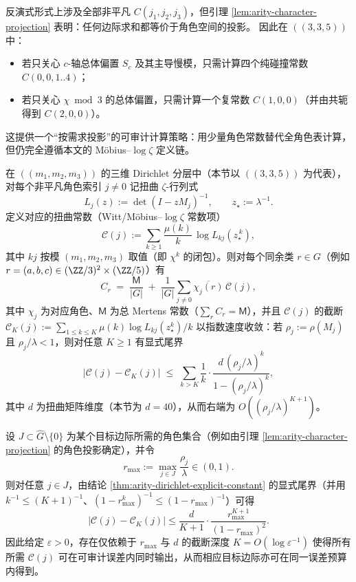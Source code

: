 \begin{remark}\label{rem:arity-335-projection-compression}
反演式形式上涉及全部非平凡 \(C(j_1,j_2,j_3)\)，但引理 \ref{lem:arity-character-projection} 表明：任何边际求和都等价于角色空间的投影。
因此在 \(((3,3,5))\) 中：
\begin{itemize}
  \item 若只关心 \(c\)-轴总体偏置 \(S_c\) 及其主导慢模，只需计算四个纯碰撞常数 \(C(0,0,1..4)\)；
  \item 若只关心 \(\chi\bmod 3\) 的总体偏置，只需计算一个复常数 \(C(1,0,0)\)（并由共轭得到 \(C(2,0,0)\)）。
\end{itemize}
这提供一个“按需求投影”的可审计计算策略：用少量角色常数替代全角色表计算，但仍完全遵循本文的 Möbius--\(\log\zeta\) 定义链。
\end{remark}

\begin{remark}\label{thm:arity-dirichlet-explicit-constant}
在 \(((m_1,m_2,m_3))\) 的三维 Dirichlet 分层中（本节以 \(((3,3,5))\) 为代表），对每个非平凡角色索引 \(j\neq 0\) 记扭曲 \(\zeta\)-行列式
\[
L_j(z):=\det(I-zM_j)^{-1},
\qquad
z_\star:=\lambda^{-1}.
\]
定义对应的扭曲常数（Witt/Möbius--\(\log\zeta\) 常数项）
\[
\mathcal{C}(j):=\sum_{k\ge 1}\frac{\mu(k)}{k}\,\log L_{kj}\!\left(z_\star^{\,k}\right),
\]
其中 \(kj\) 按模 \((m_1,m_2,m_3)\) 取值（即 \(\chi^{k}\) 的闭包）。则对每个同余类 \(r\in G\)（例如 \(r=(a,b,c)\in(\ZZ/3)^2\times(\ZZ/5)\)）有
\[
C_r
\;=\;
\frac{\mathsf{M}}{|G|}
\;+\;
\frac{1}{|G|}\sum_{j\neq 0}\overline{\chi_j(r)}\,\mathcal{C}(j),
\]
其中 \(\chi_j\) 为对应角色、\(\mathsf{M}\) 为总 Mertens 常数（\(\sum_r C_r=\mathsf{M}\)），并且 \(\mathcal{C}(j)\) 的截断
\(
\mathcal{C}_K(j):=\sum_{1\le k\le K}\mu(k)\log L_{kj}(z_\star^k)/k
\)
以指数速度收敛：若 \(\rho_j:=\rho(M_j)\) 且 \(\rho_j/\lambda<1\)，则对任意 \(K\ge 1\) 有显式尾界
\[
\left|\mathcal{C}(j)-\mathcal{C}_K(j)\right|
\;\le\;
\sum_{k>K}\frac{1}{k}\cdot
\frac{d\,(\rho_j/\lambda)^k}{1-(\rho_j/\lambda)^k},
\]
其中 \(d\) 为扭曲矩阵维度（本节为 \(d=40\)），从而右端为 \(O((\rho_j/\lambda)^{K+1})\)。
\end{remark}

\begin{remark}[误差预算下的对数截断深度]\label{rem:arity-dirichlet-explicit-constant-truncation-depth}
设 \(J\subset \widehat G\setminus\{0\}\) 为某个目标边际所需的角色集合（例如由引理 \ref{lem:arity-character-projection} 的角色投影确定），并令
\[
r_{\max}:=\max_{j\in J}\frac{\rho_j}{\lambda}\in(0,1).
\]
则对任意 \(j\in J\)，由结论 \ref{thm:arity-dirichlet-explicit-constant} 的显式尾界（并用 \(k^{-1}\le (K+1)^{-1}\)、\((1-r_{\max}^k)^{-1}\le (1-r_{\max})^{-1}\)）可得
\[
\bigl|\mathcal{C}(j)-\mathcal{C}_K(j)\bigr|
\le
\frac{d}{K+1}\cdot\frac{r_{\max}^{K+1}}{(1-r_{\max})^2}.
\]
因此给定 \(\varepsilon>0\)，存在仅依赖于 \(r_{\max}\) 与 \(d\) 的截断深度 \(K=O(\log\varepsilon^{-1})\) 使得所有所需 \(\mathcal{C}(j)\) 可在可审计误差内同时输出，从而相应目标边际亦可在同一误差预算内得到。
\end{remark}


